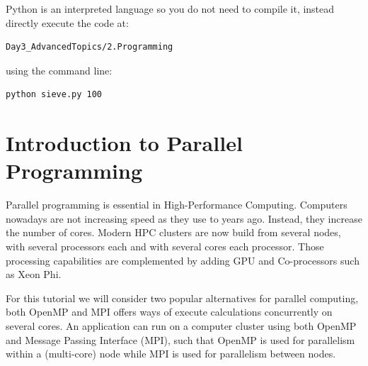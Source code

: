 Python is an interpreted language so you do not need to compile it, instead directly execute the code at:

\begin{lstlisting}
Day3_AdvancedTopics/2.Programming
\end{lstlisting}

using the command line:

\begin{lstlisting}
python sieve.py 100
\end{lstlisting}


% 
% 
% 
% 
% 


\section{Introduction to Parallel Programming}

Parallel programming is essential in High-Performance Computing. Computers nowadays are not increasing speed as they use to years ago.
Instead, they increase the number of cores.
Modern HPC clusters are now build from several nodes, with several processors each and with several cores each processor.
Those processing capabilities are complemented by adding GPU and Co-processors such as Xeon Phi.

For this tutorial we will consider two popular alternatives for parallel computing, both OpenMP and MPI offers ways of execute calculations concurrently on several cores.
An application can run on a computer cluster using both OpenMP and Message Passing Interface (MPI), such that OpenMP is used for parallelism within a (multi-core) node while MPI is used for parallelism between nodes.

